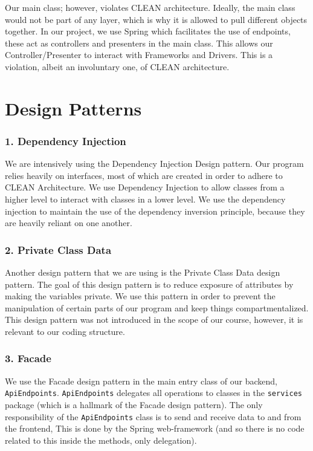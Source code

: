 \documentclass[fontsize=14pt]{article}
\def\code#1{\texttt{#1}}
\begin{document}
Our main class; however, violates CLEAN architecture. Ideally, the main class would not be part of any layer, which is why it is allowed to pull different objects together. In our project, we use Spring which facilitates the use of endpoints, these act as controllers and presenters in the main class. This allows our Controller/Presenter to interact with Frameworks and Drivers. This is a violation, albeit an involuntary one, of CLEAN architecture.  

\section*{Design Patterns}

\subsubsection*{1. Dependency Injection}
We are intensively using the Dependency Injection Design pattern. Our program relies heavily on interfaces, most of which are created in order to adhere to CLEAN Architecture. We use Dependency Injection to allow classes from a higher level to interact with classes in a lower level. We use the dependency injection to maintain the use of the dependency inversion principle, because they are heavily reliant on one another.

\subsubsection*{2. Private Class Data}
Another design pattern that we are using is the Private Class Data design pattern. The goal of this design pattern is to reduce exposure of attributes by making the variables private. We use this pattern in order to prevent the manipulation of certain parts of our program and keep things compartmentalized. This design pattern was not introduced in the scope of our course, however, it is relevant to our coding structure. %

\subsubsection*{3. Facade}
We use the Facade design pattern in the main entry class of our backend, \code{ApiEndpoints}. \code{ApiEndpoints} delegates all operations to classes in the \code{services} package (which is a hallmark of the Facade design pattern). The only responsibility of the \code{ApiEndpoints} class is to send and receive data to and from the frontend, This is done by the Spring web-framework (and so there is no code related to this inside the methods, only delegation).
\end{document}
